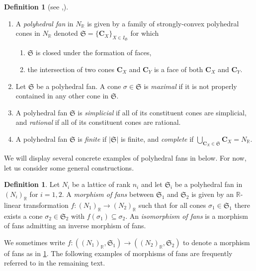 \documentclass[10pt,twoside, a4paper,reqno]{amsart}
\newcommand{\Sfrak}{\mathfrak{S}}
\newcommand{\R}{\mathbb{R}}
\newcommand{\boldC}{\mathbf{C}}
\newcommand{\Sfan}{\mathfrak{S}}
\theoremstyle{definition}
\newtheorem{definition}[theorem]{Definition}
\begin{document}
\begin{definition}[{see \cite{Zie95},\cite{CLS24}}]
\begin{enumerate}
        \item\label{def:cones+fans_fan}  
        A \textit{polyhedral fan} in $N_{\R}$ is given by a family of {strongly-convex} polyhedral cones in $N_{\R}$ denoted $\Sfan = \{\boldC_{X}\}_{X\in I_{\Sfan}}$ for which
\begin{enumerate}
    \item $\Sfan$ is closed under the formation of faces, 
    \item the intersection of two cones $\boldC_{X}$ and $\boldC_{Y}$ {is a face of both $\boldC_{X}$ and $\boldC_{Y}$.}
\end{enumerate} 
    \item {Let $\Sfan$ be a polyhedral fan. A cone $\sigma\in\Sfan$ is \textit{maximal} if it is not properly contained in any other cone in $\Sfan$.}
    \item\label{def:cones+fans_sr}  A polyhedral fan $\Sfan$ is \textit{simplicial} if all of its constituent cones are simplicial, and \textit{rational} if all of {its} constituent cones are rational. 
    \item A polyhedral fan $\Sfan$ is \textit{finite} if $|\Sfan|$ is finite, and \textit{complete} if $\bigcup\limits_{\boldC_{X}\in\Sfan} \boldC_{X} = N_{\R}$.
    \end{enumerate}
\end{definition}

We will display several concrete examples of polyhedral fans in  below. For now, let us consider some general constructions.

\begin{definition}\label{def:morfan}
    Let $N_i$ be a lattice of rank $n_i$ and let $\Sfrak_i$ be a polyhedral fan in $(N_i)_{\R}$ for $i=1,2$. A \textit{morphism of fans} between $\Sfrak_1$ and $\Sfrak_2$ is given by an $\R$-linear transformation $f\colon (N_1)_{\R} \rightarrow (N_2)_{\R} $ such that for all cones $\sigma_{1}\in\Sfrak_{1}$ there exists a cone $\sigma_2\in \Sfrak_2$ {with} $f(\sigma_1)\subseteq \sigma_2$. An \textit{isomorphism of fans} is a morphism of fans admitting an inverse morphism of fans.
\end{definition}

We sometimes write $f: ((N_1)_\R, \Sfan_1) \to ((N_2)_\R, \Sfan_2)$ to denote a morphism of fans as in \cref{def:morfan}.
The following examples of morphisms of fans are frequently referred to in the remaining text.
\end{document}
